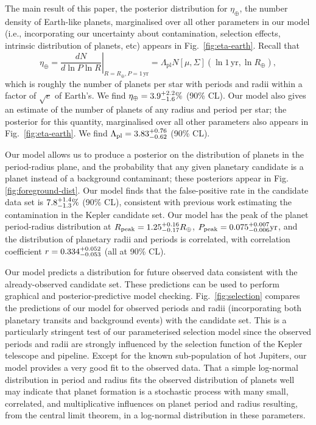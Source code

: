 \documentclass{nature}
\newcommand{\etaearth}{\eta_\oplus}
\newcommand{\Rpeak}{R_\mathrm{peak}}
\newcommand{\REarth}{R_\oplus}
\newcommand{\Rpl}{\Lambda_\mathrm{pl}}
\begin{document}
The main result of this paper, the posterior distribution for
$\etaearth$, the number density of Earth-like planets, marginalised
over all other parameters in our model (i.e., incorporating our
uncertainty about contamination, selection effects, intrinsic
distribution of planets, etc) appears in Fig.\ \ref{fig:eta-earth}.
Recall that
\begin{equation}
  \etaearth = \left. \frac{dN}{d \ln P \ln R} \right|_{R = \REarth, P
    = 1\,\mathrm{yr}} = \Rpl N\left[ \mu, \Sigma \right]\left( \ln 1\,\mathrm{yr},
  \ln \REarth \right),
\end{equation}
which is roughly the number of planets per star with periods and radii
within a factor of $\sqrt{e}$ of Earth's.  We find $\etaearth =
\earange$ (90\% CL).  Our model also gives an estimate of the number
of planets of any radius and period per star; the posterior for this
quantity, marginalised over all other parameters also appears in
Fig.\ \ref{fig:eta-earth}.  We find $\Rpl = \rplrange$ (90\% CL).

Our model allows us to produce a posterior on the distribution of
planets in the period-radius plane, and the probability that any given
planetary candidate is a planet instead of a background contaminant;
these posteriors appear in Fig. \ref{fig:foreground-dist}.  Our model
finds that the false-positive rate in the candidate data set is
$7.8_{-1.3}^{+1.4}\%$ (90\% CL), consistent with previous
work\cite{Fressin2013} estimating the contamination in the Kepler
candidate set.  Our model has the peak of the planet period-radius
distribution at $\Rpeak = \rpeakrange \REarth$, $P_\mathrm{peak} =
0.075_{-0.006}^{+0.007} \mathrm{yr}$, and the distribution of planetary radii and
periods is correlated, with correlation coefficient $r =
0.334_{-0.053}^{+0.052}$ (all at 90\% CL).

Our model predicts a distribution for future observed data consistent
with the already-observed candidate set.  These predictions can be
used to perform graphical and posterior-predictive model
checking\cite{Gelman2013}.  Fig.\ \ref{fig:selection} compares the
predictions of our model for observed periods and radii (incorporating
both planetary transits and background events) with the candidate set.
This is a particularly stringent test of our parameterised selection
model since the observed periods and radii are strongly influenced by
the selection function of the Kepler telescope and pipeline.  Except
for the known sub-population of hot
Jupiters\cite{Albrecht2012,Naoz2012}, our model provides a very good
fit to the observed data.  That a simple log-normal distribution in
period and radius fits the observed distribution of planets well may
indicate that planet formation is a stochastic process with many
small, correlated, and multiplicative influences on planet period and
radius resulting, from the central limit theorem, in a log-normal
distribution in these parameters.
\end{document}
